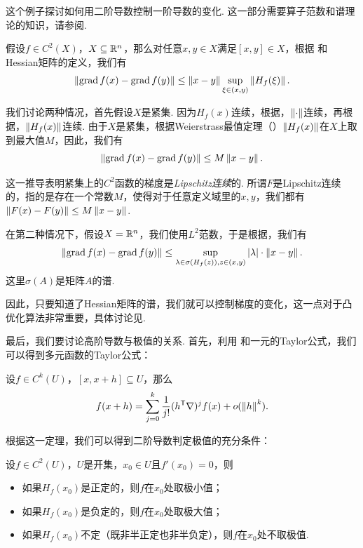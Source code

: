 \begin{example}\label{example:lagrange-finite-multi}
这个例子探讨如何用二阶导数控制一阶导数的变化. 这一部分需要算子范数和谱理论的知识，请参阅. 

假设$f\in C^2(X)$，$X\subseteq\mathbb{R}^n$，那么对任意$x,y\in X$满足$[x,y]\in X$，根据 和Hessian矩阵的定义，我们有
\[\left\|\operatorname*{grad} f(x)-\operatorname*{grad} f(y)\right\|\leq \left\|x-y\right\|\sup_{\xi\in(x,y)}\left\|H_f(\xi)\right\|.\]

我们讨论两种情况，首先假设$X$是紧集. 因为$H_f(x)$连续，根据，$\left\|\cdot\right\|$连续，再根据，$\left\|H_f(x)\right\|$连续. 由于$X$是紧集，根据Weierstrass最值定理（）$\left\|H_f(x)\right\|$在$X$上取到最大值$M$，因此，我们有
\[\left\|\operatorname*{grad} f(x)-\operatorname*{grad} f(y)\right\|\leq M\left\|x-y\right\|.\]

这一推导表明紧集上的$C^2$函数的梯度是\textit{Lipschitz连续}的. 所谓$F$是Lipschitz连续的，指的是存在一个常数$M$，使得对于任意定义域里的$x,y$，我们都有$\left\|F(x)-F(y)\right\|\leq M\left\|x-y\right\|$. 

在第二种情况下，假设$X=\mathbb{R}^n$，我们使用$L^2$范数，于是根据，我们有
\[\left\|\operatorname*{grad} f(x)-\operatorname*{grad} f(y)\right\|\leq\sup_{\lambda\in\sigma(H_f(z)),z\in(x,y)}|\lambda|\cdot \left\|x-y\right\|.\]
这里$\sigma(A)$是矩阵$A$的谱. 

因此，只要知道了Hessian矩阵的谱，我们就可以控制梯度的变化，这一点对于凸优化算法非常重要，具体讨论见.
\end{example}

最后，我们要讨论高阶导数与极值的关系. 首先，利用 和一元的Taylor公式，我们可以得到多元函数的Taylor公式：

\begin{theorem}[Taylor展开]
    设$f\in C^k(U)$，$[x,x+h]\subseteq U$，那么
    \[
        f(x+h)=\sum_{j=0}^k\frac{1}{j!}(h^{\mathsf{T}}\nabla)^jf(x)+o(\left\|h\right\|^k).
    \]
\end{theorem}

根据这一定理，我们可以得到二阶导数判定极值的充分条件：

\begin{theorem}\label{theorem:second-derivative-test}
    设$f\in C^2(U)$，$U$是开集，$x_0\in U$且$f'(x_0)=0$，则
    \begin{itemize}
        \item 如果$H_f(x_0)$是正定的，则$f$在$x_0$处取极小值；
        \item 如果$H_f(x_0)$是负定的，则$f$在$x_0$处取极大值；
        \item 如果$H_f(x_0)$不定（既非半正定也非半负定），则$f$在$x_0$处不取极值.
    \end{itemize}
\end{theorem}

